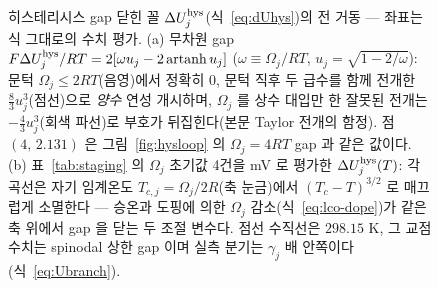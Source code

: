 \begin{figure}[t]
{%
}
\caption{히스테리시스 gap 닫힌 꼴 $\Delta U_j^{\mathrm{hys}}$(식~\eqref{eq:dUhys})의 전 거동 --- 좌표는 식
그대로의 수치 평가. (a) 무차원 gap $F\Delta U_j^{\mathrm{hys}}/RT=2[\omega u_j-2\,\mathrm{artanh}\,u_j]$
($\omega\equiv\Omega_j/RT$, $u_j=\sqrt{1-2/\omega}$): 문턱 $\Omega_j\le2RT$(음영)에서 정확히 $0$,
문턱 직후 두 급수를 함께 전개한 $\tfrac83u_j^3$(점선)으로 \emph{양수} 연성 개시하며, $\Omega_j$ 를
상수 대입만 한 잘못된 전개는 $-\tfrac43u_j^3$(회색 파선)로 부호가 뒤집힌다(본문 Taylor 전개의 함정).
점 $(4,\,2.131)$ 은 그림~\ref{fig:hysloop} 의 $\Omega_j{=}4RT$ gap 과 같은 값이다.
(b) 표~\ref{tab:staging} 의 $\Omega_j$ 초기값 4건을 mV 로 평가한 $\Delta U_j^{\mathrm{hys}}(T)$: 각 곡선은
자기 임계온도 $T_{c,j}=\Omega_j/2R$(축 눈금)에서 $(T_c-T)^{3/2}$ 로 매끄럽게 소멸한다 --- 승온과
도핑에 의한 $\Omega_j$ 감소(식~\eqref{eq:lco-dope})가 같은 축 위에서 gap 을 닫는 두 조절 변수다.
점선 수직선은 $298.15$ K, 그 교점 수치는 spinodal 상한 gap 이며 실측 분기는 $\gamma_j$ 배 안쪽이다
(식~\eqref{eq:Ubranch}).}
\label{fig:hysgap}
\end{figure}

